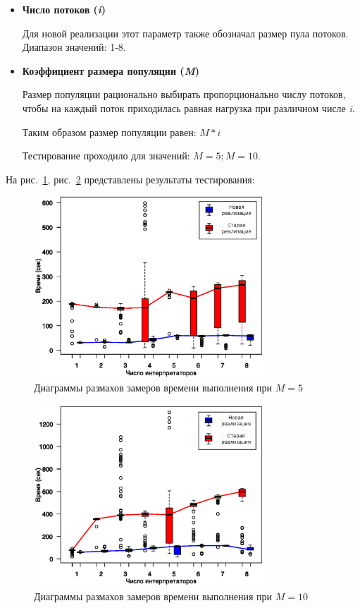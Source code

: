 \begin{itemize}
    \item \textbf{Число потоков (\textit{i})}

        Для новой реализации этот параметр также
        обозначал размер пула потоков.
        Диапазон значений: 1-8.
    \item \textbf{Коэффициент размера популяции (\textit{M})}

        Размер популяции рационально выбирать
        пропорционально числу потоков,
        чтобы на каждый поток приходилась
        равная нагрузка при различном
        числе \textit{i}.

        Таким образом размер популяции равен:
        \begin{math}M * i\end{math}

        Тестирование проходило для значений:
        \begin{math}M = 5; M = 10\end{math}.
\end{itemize}

\break
На рис.~\ref{fig:m5}, рис.~\ref{fig:m10} представлены результаты тестирования:

\begin{figure}[!h]
\centering
\includegraphics[width=0.77\textwidth]{m5}
\caption{Диаграммы размахов замеров времени выполнения при $M = 5$}
\label{fig:m5}
\end{figure}

\begin{figure}[!h]
\centering
\includegraphics[width=0.77\textwidth]{m10}
\caption{Диаграммы размахов замеров времени выполнения при $M = 10$}
\label{fig:m10}
\end{figure}

